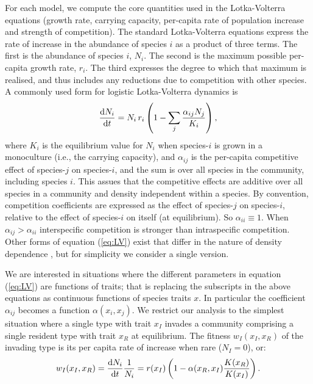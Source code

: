 \documentclass[a4paper,11pt]{article}
\begin{document}
For each model, we compute the core quantities used in the
Lotka-Volterra equations (growth rate, carrying capacity, per-capita
rate of population increase and strength of competition).  The
standard Lotka-Volterra equations express the rate of increase in the
abundance of species $i$ as a product of three terms.
%
The first is the abundance of species $i$, $N_i$.
%
The second is the maximum possible per-capita growth rate, $r_i$. The
third expresses the degree to which that maximum is realised, and
thus includes any reductions due to competition with other species. A
commonly used form for logistic Lotka-Volterra dynamics is
%
\begin{equation}
\label{eq:LV}
\frac{\mathrm{d} N_i}{\mathrm{d} t} =
N_i\, r_i \left(1 - \sum_j \frac{\alpha_{ij} N_j}{K_i}\right),
\end{equation}
%
where $K_i$ is the equilibrium value for $N_i$ when species-$i$ is
grown in a monoculture (i.e., the carrying capacity), and
$\alpha_{ij}$ is the per-capita competitive effect of species-$j$ on
species-$i$, and the sum is over all species in the community,
including species $i$.  This assues that the competitive effects are
additive over all species in a community and density independent
within a species.
%
By convention, competition coefficients are expressed as the effect of
species-$j$ on species-$i$, relative to the effect of species-$i$ on
itself (at equilibrium).  So $\alpha_{ii} \equiv 1$. When
$\alpha_{ij} > \alpha_{ii}$ interspecific competition is stronger than
intraspecific competition.
%
Other forms of equation (\ref{eq:LV}) exist that differ in the nature
of density dependence \citep[e.g.][]{Leimar-2013}, but for simplicity
we consider a single version.

We are interested in situations where the different parameters in
equation (\ref{eq:LV}) are functions of traits; that is replacing the
subscripts in the above equations as continuous functions of species
traits $x$.  In particular the coefficient $\alpha_{ij}$ becomes a
function $\alpha(x_i, x_j)$.
%
We restrict our analysis to the simplest situation where a single
type with trait $x_I$ invades a community comprising a single
resident type with trait $x_R$ at equilibrium.  The fitness $w_I(x_I,
x_R)$ of the invading type is its per capita rate of increase when
rare ($N_I = 0$), or:
%
\begin{equation}
  \label{eq:LVi}
   w_I(x_I, x_R) = \frac{\mathrm{d} N_i}{\mathrm{d} t} \frac{1}{N_i} =
    r(x_I)\left(1 - \alpha(x_R, x_I) \frac{K(x_R)}{K(x_I)}\right).
\end{equation}
\end{document}
